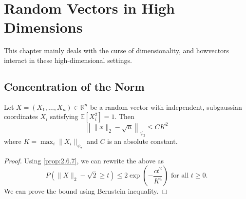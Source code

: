\section{Random Vectors in High Dimensions}
This chapter mainly deals with the curse of dimensionality, and howvectors interact in these 
high-dimensional settings.

\subsection{Concentration of the Norm}
\begin{theorem}
\label{thm:3.1.1}
Let $X = (X_1, \dots, X_n) \in \mathbb{R}^n$ be a random vector with independent, subgaussian coordinates 
$X_i$ satisfying $\mathbb{E}[X_i^2] = 1$. Then 
\[ \left\lVert \lVert x \rVert_2 - \sqrt{n} \right\rVert_{\psi_2} \leq CK^2 \]
where $K = \max_{i} \lVert X_i \rVert_{\psi_2}$ and $C$ is an absolute constant.
\end{theorem}

\begin{proof}
Using \cref{prop:2.6.7}, we can rewrite the above as 
\[ P(\lVert X \rVert_2 - \sqrt{2} \geq t) \leq 2\exp{\left( -\frac{ct^2}{K^4} \right)} \text{ for all } 
t \geq 0. \]
We can prove the bound using Bernstein inequality. 
\end{proof}
